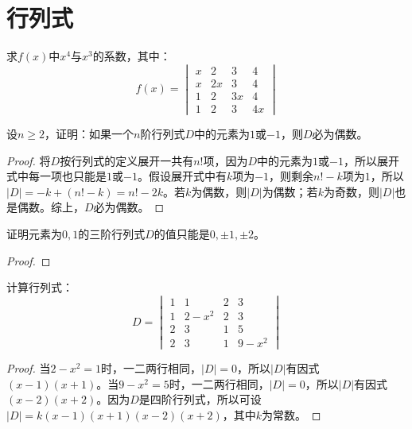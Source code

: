 \chapter{行列式}

\begin{theorem}
	求$f(x)$中$x^4$与$x^3$的系数，其中：
	\begin{equation*}
		f(x)=
		\begin{vmatrix}
			x & 2 & 3 & 4 \\
			x & 2x & 3 & 4 \\
			1 & 2 & 3x & 4 \\
			1 & 2 & 3 & 4x
		\end{vmatrix}
	\end{equation*}
\end{theorem}

\begin{theorem}
	设$n\geqslant2$，证明：如果一个$n$阶行列式$D$中的元素为$1$或$-1$，则$D$必为偶数。
\end{theorem}
\begin{proof}
	将$D$按行列式的定义展开一共有$n!$项，因为$D$中的元素为$1$或$-1$，所以展开式中每一项也只能是$1$或$-1$。假设展开式中有$k$项为$-1$，则剩余$n!-k$项为$1$，所以$|D|=-k+(n!-k)=n!-2k$。若$k$为偶数，则$|D|$为偶数；若$k$为奇数，则$|D|$也是偶数。综上，$D$必为偶数。
\end{proof}

\begin{theorem}
	证明元素为$0,1$的三阶行列式$D$的值只能是$0,\pm1,\pm2$。
\end{theorem}
\begin{proof}
	
\end{proof}

\begin{theorem}
	计算行列式：
	\begin{equation*}
		D=
		\begin{vmatrix}
			1 & 1 & 2 & 3 \\
			1 & 2-x^2 & 2 & 3 \\
			2 & 3 & 1 & 5 \\ 
			2 & 3 & 1 & 9-x^2
 		\end{vmatrix}
	\end{equation*}
\end{theorem}
\begin{proof}
	当$2-x^2=1$时，一二两行相同，$|D|=0$，所以$|D|$有因式$(x-1)(x+1)$。当$9-x^2=5$时，一二两行相同，$|D|=0$，所以$|D|$有因式$(x-2)(x+2)$。因为$D$是四阶行列式，所以可设$|D|=k(x-1)(x+1)(x-2)(x+2)$，其中$k$为常数。
\end{proof}

